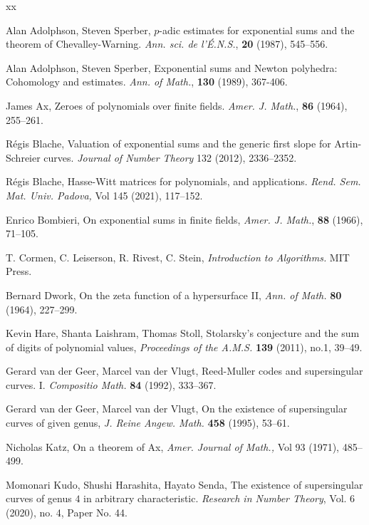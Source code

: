 \documentclass{amsart}
\numberwithin{equation}{section}
\theoremstyle{plain}
\theoremstyle{definition}
\begin{document}
\medskip


\begin{thebibliography}{xx}

Alan Adolphson, Steven Sperber,
$p$-adic estimates for exponential sums and the theorem of Chevalley-Warning.
{\it Ann. sci. de l'\'E.N.S.}, 
{\bf 20} (1987), 545--556.

Alan Adolphson, Steven Sperber,
Exponential sums and Newton polyhedra:
Cohomology and estimates.
{\it Ann. of Math.}, {\bf 130} (1989), 367-406.

James Ax,
Zeroes of polynomials over finite fields.
{\it Amer. J. Math.},
{\bf 86} (1964), 255--261.

R\'egis Blache,
Valuation of exponential sums and the generic first slope for 
Artin-Schreier curves.
{\it Journal of Number Theory}
132 (2012), 2336--2352.

R\'egis Blache,
Hasse-Witt matrices for polynomials, and applications.
{\it Rend. Sem. Mat. Univ. Padova,}
Vol 145 (2021), 117--152.



Enrico Bombieri, 
On exponential sums in finite fields, 
{\it Amer. J. Math.},
{\bf 88} (1966), 71--105.

T. Cormen, C. Leiserson, R. Rivest, C. Stein,
{\it Introduction to Algorithms.}
MIT Press.

Bernard Dwork,
On the zeta function of a hypersurface II,
{\it Ann. of Math.} {\bf 80} (1964), 227--299.

Kevin Hare, Shanta Laishram, Thomas Stoll,
Stolarsky's conjecture and the sum of digits of polynomial values,
{\it Proceedings of the A.M.S.} {\bf 139} (2011), no.1, 39--49.

Gerard van der Geer, Marcel van der Vlugt,
Reed-Muller codes and supersingular curves. I. 
{\it Compositio Math.} {\bf 84} (1992), 333--367.
 
Gerard van der Geer, Marcel van der Vlugt,
On the existence of supersingular curves of given genus, 
{\it J. Reine Angew. Math.} {\bf 458} (1995), 53--61. 

Nicholas Katz,
On a theorem of Ax, 
{\it Amer. Journal of Math.,} Vol 93 (1971), 485--499.

Momonari Kudo,
Shushi Harashita,
Hayato Senda,
The existence of supersingular curves of genus $4$ in arbitrary 
characteristic.
{\it Research in Number Theory}, 
Vol. 6 (2020), no. 4, Paper No. 44.


\end{thebibliography}
\end{document}
